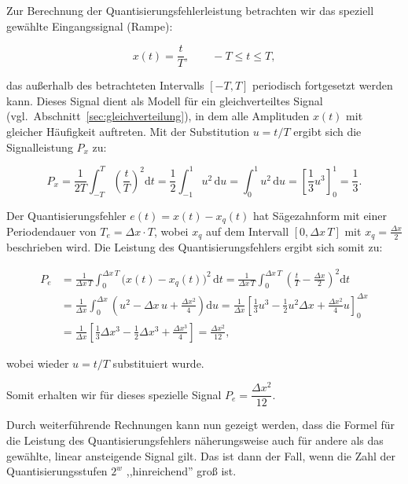 \begin{beweis}
Zur Berechnung der Quantisierungsfehlerleistung betrachten wir das speziell gewählte Eingangssignal (Rampe):

$$
x(t) = \frac{t}{T}, \qquad -T \leq t \leq T,
$$

das außerhalb des betrachteten Intervalls $[-T, T]$ periodisch fortgesetzt werden kann. Dieses Signal dient als Modell für ein gleichverteiltes Signal (vgl.\ Abschnitt~\ref{sec:gleichverteilung}), in dem alle Amplituden $x(t)$ mit gleicher Häufigkeit auftreten. Mit der Substitution $u = t/T$ ergibt sich die Signalleistung $P_x$ zu:

$$
P_x = \frac{1}{2T} \int_{-T}^{T} \left(\frac{t}{T}\right)^2 \mathrm{d}t
= \frac{1}{2} \int_{-1}^{1} u^2\,\mathrm{d}u
= \int_0^1 u^2\,\mathrm{d}u
= \left[\frac{1}{3}u^3\right]_0^1 = \frac{1}{3}.
$$

Der Quantisierungsfehler $e(t) = x(t) - x_q(t)$ hat Sägezahnform mit einer Periodendauer von $T_e = \Delta x \cdot T$, wobei $x_q$ auf dem Intervall $[0, \Delta x\, T]$ mit $x_q = \frac{\Delta x}{2}$ beschrieben wird. Die Leistung des Quantisierungsfehlers ergibt sich somit zu:

\begin{align*}
P_e &= \frac{1}{\Delta x\, T} \int_0^{\Delta x\, T} \bigl(x(t) - x_q(t)\bigr)^2\,\mathrm{d}t
     = \frac{1}{\Delta x\, T} \int_0^{\Delta x\, T} \left(\frac{t}{T} - \frac{\Delta x}{2}\right)^2 \mathrm{d}t \\
    &= \frac{1}{\Delta x} \int_0^{\Delta x} \left(u^2 - \Delta x\, u + \frac{\Delta x^2}{4}\right) \mathrm{d}u
     = \frac{1}{\Delta x} \left[\frac{1}{3}u^3 - \frac{1}{2}u^2 \Delta x + \frac{\Delta x^2}{4}u\right]_0^{\Delta x} \\
    &= \frac{1}{\Delta x} \left[\frac{1}{3}\Delta x^3 - \frac{1}{2}\Delta x^3 + \frac{\Delta x^3}{4}\right]
     = \frac{\Delta x^2}{12},
\end{align*}

wobei wieder $u = t/T$ substituiert wurde.

Somit erhalten wir für dieses spezielle Signal $P_e = \dfrac{\Delta x^2}{12}$.
\end{beweis}

Durch weiterführende Rechnungen kann nun gezeigt werden, dass die Formel für die Leistung des Quantisierungsfehlers näherungsweise auch für andere als das gewählte, linear ansteigende Signal gilt. Das ist dann der Fall, wenn die Zahl der Quantisierungsstufen $2^w$ ,,hinreichend'' groß ist.

